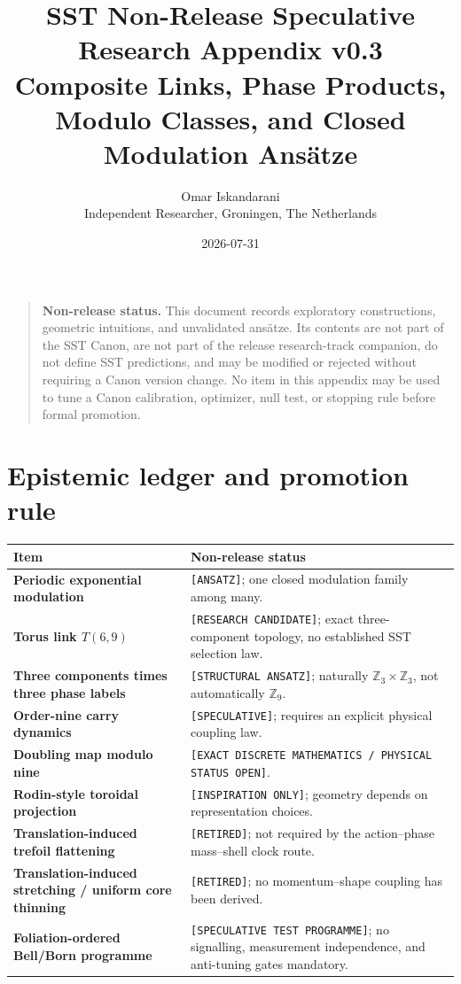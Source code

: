 \documentclass[11pt]{article}
\title{SST Non-Release Speculative Research Appendix v0.3\\
\large Composite Links, Phase Products, Modulo Classes, and Closed Modulation Ans\"atze}
\author{Omar Iskandarani\\Independent Researcher, Groningen, The Netherlands}
\date{2026-07-31}
\newcommand{\Z}{\mathbb Z}
\begin{document}
\maketitle

\begin{quote}
\textbf{Non-release status.}
This document records exploratory constructions, geometric intuitions, and
unvalidated ans\"atze.  Its contents are not part of the SST Canon, are not part
of the release research-track companion, do not define SST predictions, and
may be modified or rejected without requiring a Canon version change.  No item
in this appendix may be used to tune a Canon calibration, optimizer, null test,
or stopping rule before formal promotion.
\end{quote}

\section{Epistemic ledger and promotion rule}

\begin{center}
\begin{tabularx}{0.96\textwidth}{@{}>{\bfseries}p{}X@{}}
\toprule
Item & Non-release status \\
\midrule
Periodic exponential modulation & \texttt{[ANSATZ]}; one closed modulation family among many. \\
Torus link $T(6,9)$ & \texttt{[RESEARCH CANDIDATE]}; exact three-component topology, no established SST selection law. \\
Three components times three phase labels & \texttt{[STRUCTURAL ANSATZ]}; naturally $\Z_3\times\Z_3$, not automatically $\Z_9$. \\
Order-nine carry dynamics & \texttt{[SPECULATIVE]}; requires an explicit physical coupling law. \\
Doubling map modulo nine & \texttt{[EXACT DISCRETE MATHEMATICS / PHYSICAL STATUS OPEN]}. \\
Rodin-style toroidal projection & \texttt{[INSPIRATION ONLY]}; geometry depends on representation choices. \\
Translation-induced trefoil flattening & \texttt{[RETIRED]}; not required by the action--phase mass--shell clock route. \\
Translation-induced stretching / uniform core thinning & \texttt{[RETIRED]}; no momentum--shape coupling has been derived. \\
Foliation-ordered Bell/Born programme & \texttt{[SPECULATIVE TEST PROGRAMME]}; no signalling, measurement independence, and anti-tuning gates mandatory. \\
\bottomrule
\end{tabularx}
\end{center}
\end{document}
